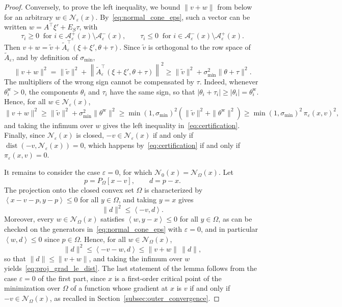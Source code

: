 \documentclass[pdflatex,sn-mathphys-num]{sn-jnl}%
\theoremstyle{thmstyleone}%
\newcommand{\calA}{{\mathcal{A}}}
\newcommand{\calN}{{\mathcal{N}}}
\newcommand{\inner}[2]{\left\langle {#1} , {#2} \right\rangle} %
\newcommand{\proj}[2]{P_{#1} \left[ {#2} \right]} %
\begin{document}
\begin{proof}
	Conversely, to prove the left inequality, we bound $\|v+w\|$ from below for an arbitrary $w \in \calN_\varepsilon(x)$. By~\eqref{eq:normal_cone_eps}, such a vector can be written $w = A^\top\xi' + E_S\tau$, with
	\[\tau_i \ge 0 \ \text{ for } i \in \calA^+_\varepsilon(x)\setminus\calA^-_\varepsilon(x), \qquad \tau_i \le 0 \ \text{ for } i \in \calA^-_\varepsilon(x)\setminus\calA^+_\varepsilon(x).\]
	Then $v + w = \tilde{v} + \tilde{A}_\varepsilon^\top(\xi+\xi',\theta+\tau)$. Since $\tilde{v}$ is orthogonal to the row space of $\tilde{A}_\varepsilon$, and by definition of $\sigma_{\min}$,
	\[\|v+w\|^2 = \|\tilde{v}\|^2 + \left\|\tilde{A}_\varepsilon^\top(\xi+\xi',\theta+\tau)\right\|^2 \ge \|\tilde{v}\|^2 + \sigma_{\min}^2\|\theta+\tau\|^2.\]
	The multipliers of the wrong sign cannot be compensated by $\tau$. Indeed, whenever $\theta^{\mathrm{w}}_i > 0$, the components $\theta_i$ and $\tau_i$ have the same sign, so that $|\theta_i + \tau_i| \ge |\theta_i| = \theta^{\mathrm{w}}_i$. Hence, for all $w \in \calN_\varepsilon(x)$,
	\[\|v+w\|^2 \ge \|\tilde{v}\|^2 + \sigma_{\min}^2\|\theta^{\mathrm{w}}\|^2 \ge \min(1,\sigma_{\min})^2\left(\|\tilde{v}\|^2 + \|\theta^{\mathrm{w}}\|^2\right) \ge \min(1,\sigma_{\min})^2\,\pi_\varepsilon(x,v)^2,\]
	and taking the infimum over $w$ gives the left inequality in~\eqref{eq:certification}. Finally, since $\calN_\varepsilon(x)$ is closed, $-v \in \calN_\varepsilon(x)$ if and only if $\operatorname{dist}(-v,\calN_\varepsilon(x)) = 0$, which happens by~\eqref{eq:certification} if and only if $\pi_\varepsilon(x,v) = 0$.

	It remains to consider the case $\varepsilon = 0$, for which $\calN_0(x) = \calN_\Omega(x)$. Let
	\[p = \proj{\Omega}{x-v}, \qquad d = p - x.\]
	The projection onto the closed convex set $\Omega$ is characterized by $\inner{x-v-p}{y-p} \le 0$ for all $y \in \Omega$, and taking $y = x$ gives
	\[\|d\|^2 \le \inner{-v}{d}.\]
	Moreover, every $w \in \calN_\Omega(x)$ satisfies $\inner{w}{y-x} \le 0$ for all $y \in \Omega$, as can be checked on the generators in~\eqref{eq:normal_cone_eps} with $\varepsilon = 0$, and in particular $\inner{w}{d} \le 0$ since $p \in \Omega$. Hence, for all $w \in \calN_\Omega(x)$,
	\[\|d\|^2 \le \inner{-v-w}{d} \le \|v+w\|\,\|d\|,\]
	so that $\|d\| \le \|v+w\|$, and taking the infimum over $w$ yields~\eqref{eq:proj_grad_le_dist}. The last statement of the lemma follows from the case $\varepsilon = 0$ of the first part, since $x$ is a first-order critical point of the minimization over $\Omega$ of a function whose gradient at $x$ is $v$ if and only if $-v \in \calN_\Omega(x)$, as recalled in Section~\ref{subsec:outer_convergence}.
\end{proof}
\end{document}
